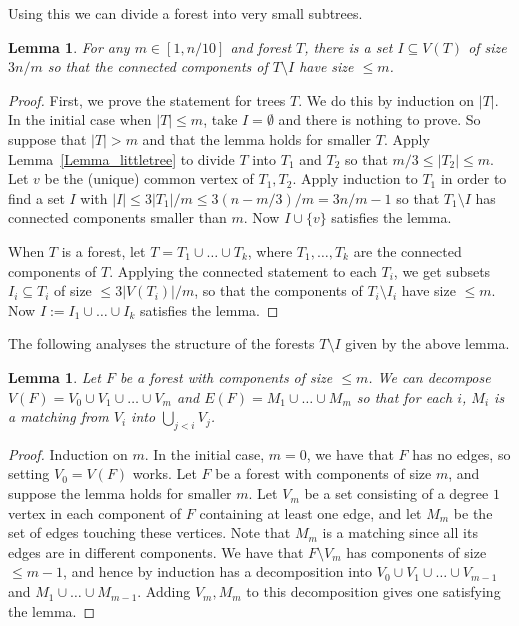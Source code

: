 \documentclass[a4paper,11pt,hidelinks]{amsart}
\newtheorem{lemma}[theorem]{Lemma}
\theoremstyle{definition}
\begin{document}
Using this we can divide a forest into very small subtrees.
\begin{lemma}\label{Lemma_split_tree_small_components}
For any $m\in [1,n/10]$ and forest $T$, there is a set $I\subseteq V(T)$ of size $3n/m$  so that the connected components of $T\setminus I$ have size $\leq m$.
\end{lemma}
\begin{proof}
First, we prove the statement for trees $T$.
We do this by induction on $|T|$. In the initial case when $|T|\leq m$, take $I=\emptyset$ and there is nothing to prove. So suppose that $|T|>m$ and that the lemma holds for smaller $T$. Apply Lemma~\ref{Lemma_littletree} to divide $T$ into $T_1$ and $T_2$ so that $m/3\leq |T_2|\leq m$. Let $v$ be the (unique) common vertex of $T_1, T_2$. Apply induction to $T_1$ in order to find a set $I$ with $|I|\leq 3|T_1|/m\leq 3(n-m/3)/m=3n/m-1$ so that $T_1\setminus I$ has connected components smaller than $m$. Now $I\cup \{v\}$ satisfies the lemma.

When $T$ is a forest, let $T=T_1\cup \dots \cup T_k$, where $T_1, \dots, T_k$ are the connected components of $T$. Applying the connected statement to each $T_i$, we get subsets $I_i\subseteq T_i$ of size $\leq 3|V(T_i)|/m$, so that the components of $T_i\setminus I_i$ have size $\leq m$. Now $I:=I_1\cup \dots \cup I_k$ satisfies the lemma.
\end{proof}
The following analyses the structure of the forests $T\setminus I$ given by the above lemma.
\begin{lemma}\label{Lemma_decompose_forest_matchings}
Let $F$ be a forest with components of size $\leq m$. We can decompose $V(F)=V_0\cup V_1\cup \dots \cup V_m$ and $E(F)=M_1\cup \dots \cup M_m$ so that for each $i$, $M_i$ is  a matching from $V_i$ into $\bigcup_{j<i}V_j$.
\end{lemma}
\begin{proof}
Induction on $m$. In the initial case, $m=0$, we have that $F$ has no edges, so setting $V_0=V(F)$ works. Let $F$ be a forest with components of size $m$, and suppose the lemma holds for smaller $m$. Let $V_m$ be a set consisting of a degree $1$ vertex in each component of $F$ containing at least one edge, and let $M_m$ be the set of edges touching these vertices. Note that $M_m$ is a matching since all its edges are in different components.
We have that $F\setminus V_m$ has components of size $\leq m-1$, and hence by induction has a decomposition into $V_0\cup V_1\cup \dots \cup V_{m-1}$ and $M_1\cup \dots \cup M_{m-1}$. Adding $V_m, M_m$ to this decomposition gives one satisfying the lemma.
\end{proof}
\end{document}

